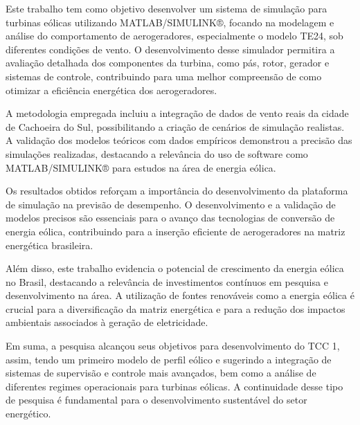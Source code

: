 
\par Este trabalho tem como objetivo desenvolver um sistema de simulação para turbinas eólicas utilizando MATLAB/SIMULINK®, focando na modelagem e análise do comportamento de aerogeradores, especialmente o modelo TE24, sob diferentes condições de vento. O desenvolvimento desse simulador permitira a avaliação detalhada dos componentes da turbina, como pás, rotor, gerador e sistemas de controle, contribuindo para uma melhor compreensão de como otimizar a eficiência energética dos aerogeradores.

\par A metodologia empregada incluiu a integração de dados de vento reais da cidade de Cachoeira do Sul, possibilitando a criação de cenários de simulação realistas. A validação dos modelos teóricos com dados empíricos demonstrou a precisão das simulações realizadas, destacando a relevância do uso de software como MATLAB/SIMULINK® para estudos na área de energia eólica.

\par Os resultados obtidos reforçam a importância do desenvolvimento da plataforma de simulação na previsão de desempenho. O desenvolvimento e a validação de modelos precisos são essenciais para o avanço das tecnologias de conversão de energia eólica, contribuindo para a inserção eficiente de aerogeradores na matriz energética brasileira.

\par Além disso, este trabalho evidencia o potencial de crescimento da energia eólica no Brasil, destacando a relevância de investimentos contínuos em pesquisa e desenvolvimento na área. A utilização de fontes renováveis como a energia eólica é crucial para a diversificação da matriz energética e para a redução dos impactos ambientais associados à geração de eletricidade.

\par Em suma, a pesquisa alcançou seus objetivos para desenvolvimento do TCC 1, assim, tendo um primeiro modelo de perfil eólico e  sugerindo a integração de sistemas de supervisão e controle mais avançados, bem como a análise de diferentes regimes operacionais para turbinas eólicas. A continuidade desse tipo de pesquisa é fundamental para o desenvolvimento sustentável do setor energético.